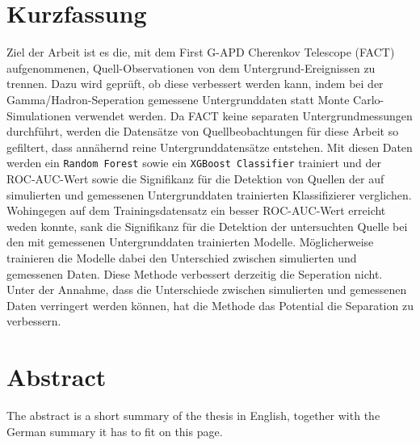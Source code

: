 \thispagestyle{plain}

\section*{Kurzfassung}
Ziel der Arbeit ist es die, mit dem First G-APD Cherenkov Telescope (FACT) aufgenommenen, Quell-Observationen von dem Untergrund-Ereignissen zu trennen. 
Dazu wird geprüft, ob diese verbessert werden kann, indem bei der Gamma/Hadron-Seperation gemessene Untergrunddaten statt Monte Carlo-Simulationen verwendet werden.
Da FACT keine separaten Untergrundmessungen durchführt, werden die Datensätze von Quellbeobachtungen für diese Arbeit so gefiltert, dass annähernd reine Untergrunddatensätze entstehen.
Mit diesen Daten werden ein \texttt{Random Forest} sowie ein \texttt{XGBoost Classifier} trainiert und der ROC-AUC-Wert sowie die Signifikanz für die Detektion von Quellen der auf simulierten und gemessenen Untergrunddaten trainierten Klassifizierer verglichen. 
Wohingegen auf dem Trainingsdatensatz ein besser ROC-AUC-Wert erreicht weden konnte, sank die Signifikanz für die Detektion der untersuchten Quelle bei den mit gemessenen Untergrunddaten trainierten Modelle.
Möglicherweise trainieren die Modelle dabei den Unterschied zwischen simulierten und gemessenen Daten. 
Diese Methode verbessert derzeitig die Seperation nicht. 
Unter der Annahme, dass die Unterschiede zwischen simulierten und gemessenen Daten verringert werden können, hat die Methode das Potential die Separation zu verbessern. 
\section*{Abstract}
\begin{english}
The abstract is a short summary of the thesis in English, together with the German summary it has to fit on this page.
\end{english}
